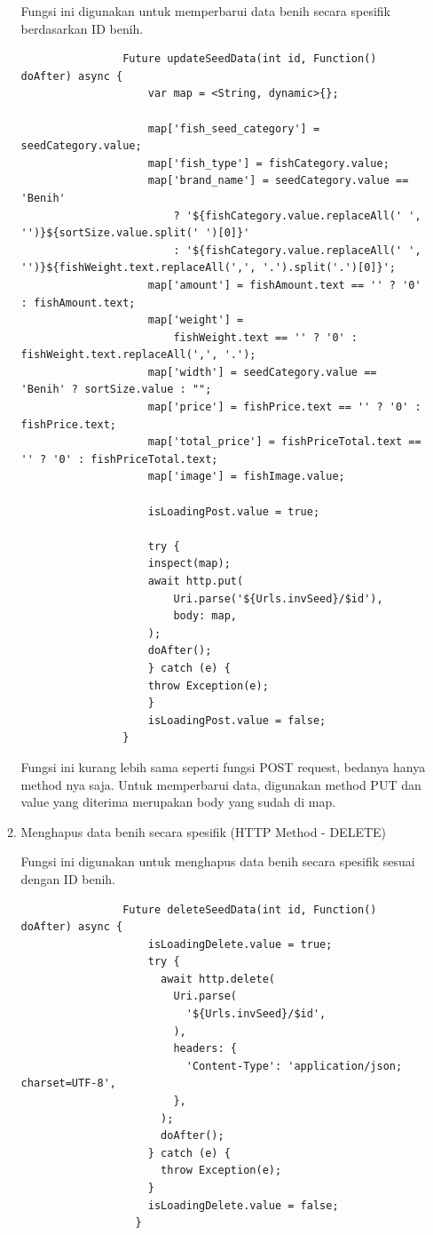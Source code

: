 \begin{spacing}{1.5}
\begin{enumerate}
\begin{enumerate}
			Fungsi ini digunakan untuk memperbarui data benih secara spesifik berdasarkan ID benih.

			\begin{lstlisting}
				Future updateSeedData(int id, Function() doAfter) async {
					var map = <String, dynamic>{};

					map['fish_seed_category'] = seedCategory.value;
					map['fish_type'] = fishCategory.value;
					map['brand_name'] = seedCategory.value == 'Benih'
						? '${fishCategory.value.replaceAll(' ', '')}${sortSize.value.split(' ')[0]}'
						: '${fishCategory.value.replaceAll(' ', '')}${fishWeight.text.replaceAll(',', '.').split('.')[0]}';
					map['amount'] = fishAmount.text == '' ? '0' : fishAmount.text;
					map['weight'] =
						fishWeight.text == '' ? '0' : fishWeight.text.replaceAll(',', '.');
					map['width'] = seedCategory.value == 'Benih' ? sortSize.value : "";
					map['price'] = fishPrice.text == '' ? '0' : fishPrice.text;
					map['total_price'] = fishPriceTotal.text == '' ? '0' : fishPriceTotal.text;
					map['image'] = fishImage.value;

					isLoadingPost.value = true;

					try {
					inspect(map);
					await http.put(
						Uri.parse('${Urls.invSeed}/$id'),
						body: map,
					);
					doAfter();
					} catch (e) {
					throw Exception(e);
					}
					isLoadingPost.value = false;
				}
			\end{lstlisting}

			Fungsi ini kurang lebih sama seperti fungsi POST request, bedanya hanya method nya saja. Untuk memperbarui data, digunakan method PUT dan value yang diterima merupakan body yang sudah di map.

			\item Menghapus data benih secara spesifik (HTTP Method - DELETE)
			
			Fungsi ini digunakan untuk menghapus data benih secara spesifik sesuai dengan ID benih.
			
			\begin{lstlisting}
				Future deleteSeedData(int id, Function() doAfter) async {
					isLoadingDelete.value = true;
					try {
					  await http.delete(
						Uri.parse(
						  '${Urls.invSeed}/$id',
						),
						headers: {
						  'Content-Type': 'application/json; charset=UTF-8',
						},
					  );
					  doAfter();
					} catch (e) {
					  throw Exception(e);
					}
					isLoadingDelete.value = false;
				  }
			\end{lstlisting}
		\end{enumerate}


\end{enumerate}
\end{spacing}
